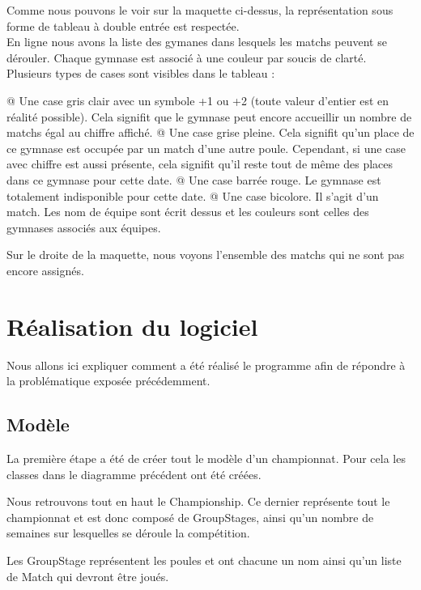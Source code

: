 \documentclass[final, noposter]{polytech/polytech}
\begin{document}
		Comme nous pouvons le voir sur la maquette ci-dessus, la représentation sous forme de tableau à double entrée est respectée. \\
		En ligne nous avons la liste des gymanes dans lesquels les matchs peuvent se dérouler. Chaque gymnase est associé à une couleur par soucis de clarté. \\
		Plusieurs types de cases sont visibles dans le tableau :
		\begin{easylist}[itemize]
			@ Une case gris clair avec un symbole +1 ou +2 (toute valeur d'entier est en réalité possible). Cela signifit que le gymnase peut encore accueillir un nombre de matchs égal au chiffre affiché.
			@ Une case grise pleine. Cela signifit qu'un place de ce gymnase est occupée par un match d'une autre poule. Cependant, si une case avec chiffre est aussi présente, cela signifit qu'il reste tout de même des places dans ce gymnase pour cette date.
			@ Une case barrée rouge. Le gymnase est totalement indisponible pour cette date.
			@ Une case bicolore. Il s'agit d'un match. Les nom de équipe sont écrit dessus et les couleurs sont celles des gymnases associés aux équipes. \\
		\end{easylist}
		Sur le droite de la maquette, nous voyons l'ensemble des matchs qui ne sont pas encore assignés.
	
\chapter{Réalisation du logiciel}
	Nous allons ici expliquer comment a été réalisé le programme afin de répondre à la problématique exposée précédemment.
	
	\section{Modèle}
		
		La première étape a été de créer tout le modèle d'un championnat.
		Pour cela les classes dans le diagramme précédent ont été créées.
		
		Nous retrouvons tout en haut le Championship.
		Ce dernier représente tout le championnat et est donc composé de GroupStages, ainsi qu'un nombre de semaines sur lesquelles se déroule la compétition.
		
		Les GroupStage représentent les poules et ont chacune un nom ainsi qu'un liste de Match qui devront être joués.
		
\end{document}
